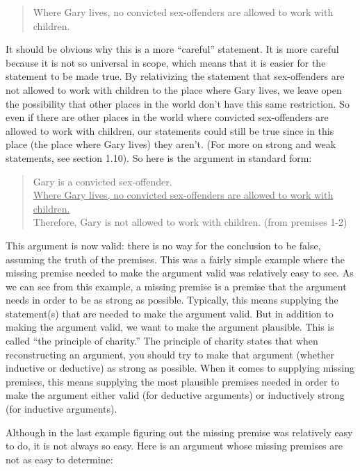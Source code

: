 \begin{quote}
Where Gary lives, no convicted sex-offenders are allowed to work with
children.
\end{quote}


It should be obvious why this is a more ``careful'' statement. It is more careful
because it is not so universal in scope, which means that it is easier for the
statement to be made true. By relativizing the statement that sex-offenders are
not allowed to work with children to the place where Gary lives, we leave open
the possibility that other places in the world don't have this same restriction. So
even if there are other places in the world where convicted sex-offenders are
allowed to work with children, our statements could still be true since in this
place (the place where Gary lives) they aren't. (For more on strong and weak
statements, see section 1.10). So here is the argument in standard form:

\begin{quote}
Gary is a convicted sex-offender. \\
\underline{Where Gary lives, no convicted sex-offenders are allowed to work with
children.} \\
Therefore, Gary is not allowed to work with children. (from premises 1-2) \\
\end{quote}

This argument is now valid: there is no way for the conclusion to be false,
assuming the truth of the premises. This was a fairly simple example where the
missing premise needed to make the argument valid was relatively easy to see.
As we can see from this example, a missing premise is a premise that the
argument needs in order to be as strong as possible. Typically, this means
supplying the statement(s) that are needed to make the argument valid. But in
addition to making the argument valid, we want to make the argument
plausible. This is called ``the principle of charity.'' The principle of charity
states that when reconstructing an argument, you should try to make that
argument (whether inductive or deductive) as strong as possible.
When it
comes to supplying missing premises, this means supplying the most plausible
premises needed in order to make the argument either valid (for deductive
arguments) or inductively strong (for inductive arguments).

Although in the last example figuring out the missing premise was relatively easy
to do, it is not always so easy. Here is an argument whose missing premises are
not as easy to determine:

